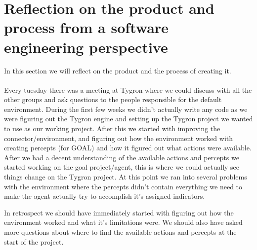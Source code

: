 \section{Reflection on the product and process from a software engineering perspective}
In this section we will reflect on the product and the process of creating it.
\\
\\
Every tuesday there was a meeting at Tygron where we could discuss with all the other groups and ask questions to the people responsible for the default environment.
During the first few weeks we didn't actually write any code as we were figuring out the Tygron engine and setting up the Tygron project we wanted to use as our working project. 
After this we started with improving the connector/environment, and figuring out how the environment worked with creating percepts (for GOAL) and how it figured out what actions were available.
After we had a decent understanding of the available actions and percepts we started working on the goal project/agent, this is where we could actually see things change on the Tygron project.
At this point we ran into several problems with the environment where the percepts didn't contain everything we need to make the agent actually try to accomplish it's assigned indicators.

In retrospect we should have immediately started with figuring out how the environment worked and what it's limitations were.
We should also have asked more questions about where to find the available actions and percepts at the start of the project.